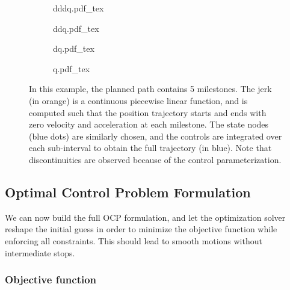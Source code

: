 \begin{figure}
  \centering
  \begin{subfigure}{0.5\columnwidth}
    \centering
        {\def\svgwidth{\linewidth}
          {\tiny
            
                       {dddq.pdf_tex}
          }
        }
  \end{subfigure}
  \begin{subfigure}{0.49\columnwidth}
    \centering
        {\def\svgwidth{\linewidth}
          {\tiny
            
                       {ddq.pdf_tex}
          }
        }
  \end{subfigure}
  \begin{subfigure}{0.49\columnwidth}
    \centering
        {\def\svgwidth{\linewidth}
          {\tiny
            
                       {dq.pdf_tex}
          }
        }
  \end{subfigure}
  \begin{subfigure}{0.5\columnwidth}
    \centering
        {\def\svgwidth{\linewidth}
          {\tiny
            
                       {q.pdf_tex}
          }
        }
  \end{subfigure}
  \caption{In this example, the planned path contains 5
    milestones. The jerk (in orange) is a continuous piecewise linear
    function, and is computed such that the position trajectory starts
    and ends with zero velocity and acceleration at each
    milestone. The state nodes (blue dots) are similarly chosen, and
    the controls are integrated over each sub-interval to obtain the
    full trajectory (in blue). Note that discontinuities are observed
    because of the control parameterization.}
  \label{fig:chap3-time-param}
\end{figure}

\subsection{Optimal Control Problem Formulation}
\label{subsec:chap3-ocp}

We can now build the full OCP formulation, and let the optimization
solver reshape the initial guess in order to minimize the objective
function while enforcing all constraints. This should lead to smooth
motions without intermediate stops.

\subsubsection{Objective function}

